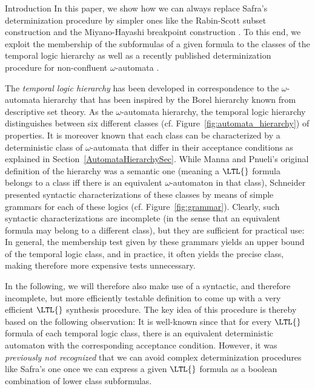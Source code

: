 \documentclass[copyright,creativecommons]{eptcs}
\begin{document}
\begin{section}{Introduction}
In this paper, we show how we can always replace Safra's determinization procedure by simpler ones like the Rabin-Scott subset construction and the Miyano-Hayashi breakpoint construction \cite{MiHa84,Schn03}. To this end, we exploit the membership of the subformulas of a given formula to the classes of the temporal logic hierarchy as well as a recently published determinization procedure for non-confluent $\omega$-automata \cite{MoSc08}.

The \emph{temporal logic hierarchy} \cite{ChMP92,Schn03} has been developed in correspondence to the $\omega$-automata hierarchy \cite{Land69} that has been inspired by the Borel hierarchy known from descriptive set theory. As the $\omega$-automata hierarchy, the temporal logic hierarchy distinguishes between six different classes (cf. Figure~\ref{fig:automata_hierarchy}) of properties. It is moreover known that each class can be characterized by a deterministic class of $\omega$-automata that differ in their acceptance conditions as explained in Section~\ref{AutomataHierarchySec}. While Manna and Pnueli's original definition of the hierarchy was a semantic one (meaning a $\LTL{}$ formula belongs to a class iff there is an equivalent $\omega$-automaton in that class), Schneider \cite{Schn01b,Schn03} presented syntactic characterizations of these classes by means of simple grammars for each of these logics (cf. Figure~\ref{fig:grammar}). Clearly, such syntactic characterizations are incomplete (in the sense that an equivalent formula may belong to a different class), but they are sufficient for practical use: In general, the membership test given by these grammars yields an upper bound of the temporal logic class, and in practice, it often yields the precise class, making therefore more expensive tests unnecessary.

In the following, we will therefore also make use of a syntactic, and therefore incomplete, but more efficiently testable definition to come up with a very efficient $\LTL{}$ synthesis procedure. The key idea of this procedure is thereby based on the following observation: It is well-known since \cite{ChMP92} that for every $\LTL{}$ formula of each temporal logic class, there is an equivalent deterministic automaton with the corresponding acceptance condition. However, it was \emph{previously not recognized} that we can avoid complex determinization procedures like Safra's one once we can express a given $\LTL{}$ formula as a boolean combination of lower class subformulas.


\end{section}
\end{document}

